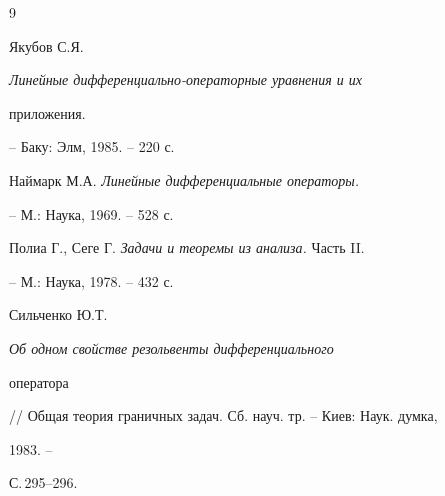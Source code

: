 \begin{thebibliography}{9} 


 




Якубов С.Я. {\em Линейные дифференциально-операторные уравнения и их 


приложения.} -- Баку: Элм, 1985. -- 220 с. 


 




Наймарк М.А. {\em Линейные дифференциальные операторы.} 


-- М.: Наука, 1969. -- 528 с. 


 




Полиа Г., Сеге Г. {\em Задачи и теоремы из анализа.} Часть II. 


-- М.: Наука, 1978. -- 432 с. 


 




Сильченко Ю.Т. {\em Об одном свойстве резольвенты дифференциального 


оператора}


// Общая теория граничных задач. Сб. науч. тр. -- Киев: Наук. думка, 


1983. -- 


С.\,295--296. 


 


\end{thebibliography} 


 


\vskip 2cm 


 






 


 


